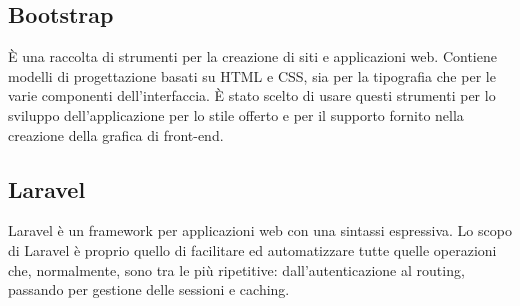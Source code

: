 \subsection{Bootstrap}
È una raccolta di strumenti per la creazione di siti e applicazioni web. Contiene modelli di progettazione basati su \gls{HTML} e \gls{CSS}, sia per la tipografia che per le varie componenti dell'interfaccia.
È stato scelto di usare questi strumenti per lo sviluppo dell'applicazione per lo stile offerto e per il supporto fornito nella creazione della grafica di \gls{front-end}.

\subsection{Laravel}
Laravel è un framework per applicazioni web con una sintassi espressiva. Lo scopo di Laravel è proprio quello di facilitare ed automatizzare tutte quelle operazioni che, normalmente, sono tra le più ripetitive: dall'autenticazione al routing, passando per gestione delle sessioni e caching.
